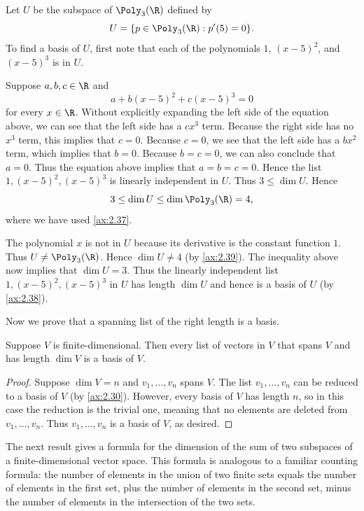 \begin{example}\label{ax:2.41}
Let $U$ be the subspace of $\Poly_3(\R)$ defined by
\[ U = \{p\in\Poly_3(\R) : p'(5)=0\}. \]
To find a basis of $U$, first note that each of the polynomials $1$, $(x-5)^2$,
and $(x-5)^3$ is in $U$.

Suppose $a,b,c\in\R$ and
\[ a+b(x-5)^2+c(x-5)^3 = 0 \]
for every $x\in\R$. Without explicitly expanding the left side of the equation
above, we can see that the left side has a $cx^3$ term. Because the right side
has no $x^3$ term, this implies that $c=0$. Because $c=0$, we see that the left
side has a $bx^2$ term, which implies that $b=0$. Because $b=c=0$, we can also
conclude that $a=0$. Thus the equation above implies that $a=b=c=0$. Hence the
list $1,(x-5)^2,(x-5)^3$ is linearly independent in $U$. Thus $3\le\dim U$.
Hence
\[ 3 \le \dim U \le \dim\Poly_3(\R) = 4, \]
where we have used \ref{ax:2.37}.

The polynomial $x$ is not in $U$ because its derivative is the constant
function $1$. Thus $U\ne\Poly_3(\R)$. Hence $\dim U\ne4$ (by \ref{ax:2.39}). The
inequality above now implies that $\dim U=3$. Thus the linearly independent list
$1,(x-5)^2,(x-5)^3$ in $U$ has length $\dim U$ and hence is a basis of $U$
(by \ref{ax:2.38}).
\end{example}

Now we prove that a spanning list of the right length is a basis.

\begin{result}\label{ax:2.42}
Suppose $V$ is finite-dimensional. Then every list of vectors in $V$ that spans
$V$ and has length $\dim V$ is a basis of $V$.
\end{result}

\begin{proof}
Suppose $\dim V=n$ and $v_1,\dots,v_n$ spans $V$. The list $v_1,\dots,v_n$ can
be reduced to a basis of $V$ (by \ref{ax:2.30}). However, every basis of $V$ has
length $n$, so in this case the reduction is the trivial one, meaning that no
elements are deleted from $v_1,\dots,v_n$. Thus $v_1,\dots,v_n$ is a basis of
$V$, as desired.
\end{proof}

The next result gives a formula for the dimension of the sum of two subspaces
of a finite-dimensional vector space. This formula is analogous to a familiar
counting formula: the number of elements in the union of two finite sets equals
the number of elements in the first set, plus the number of elements in the
second set, minus the number of elements in the intersection of the two sets.

